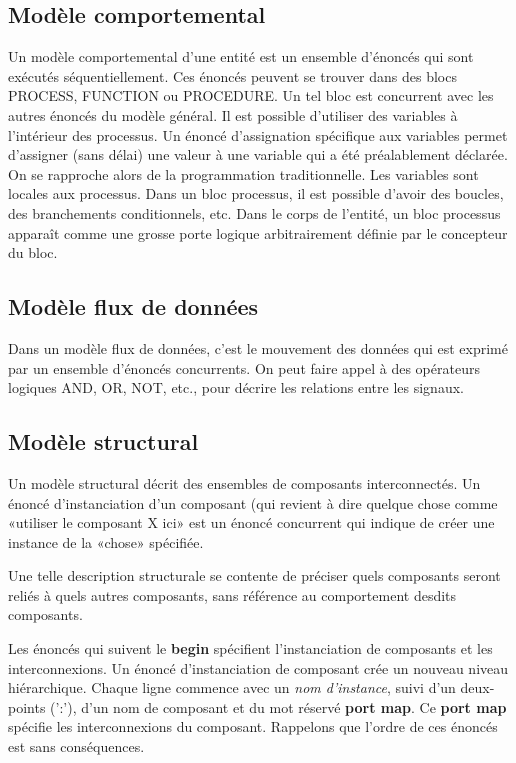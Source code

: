 \documentclass[11pt]{article}
\begin{document}
\subsection{Modèle comportemental}
\label{sec:orged5b6d6}

Un modèle comportemental d'une entité est un ensemble d'énoncés qui
sont exécutés séquentiellement. Ces énoncés peuvent se trouver dans
des blocs PROCESS, FUNCTION ou PROCEDURE. Un tel bloc est concurrent
avec les autres énoncés du modèle général. Il est possible d'utiliser
des variables à l'intérieur des processus. Un énoncé d'assignation
spécifique aux variables permet d'assigner (sans délai) une valeur à
une variable qui a été préalablement déclarée. On se rapproche alors
de la programmation traditionnelle. Les variables sont locales aux
processus. Dans un bloc processus, il est possible d'avoir des
boucles, des branchements conditionnels, etc. Dans le corps de
l'entité, un bloc processus apparaît comme une grosse porte logique
arbitrairement définie par le concepteur du bloc.

\subsection{Modèle flux de données}
\label{sec:orgf9a83f7}

Dans un modèle flux de données, c'est le mouvement des données qui est
exprimé par un ensemble d'énoncés concurrents. On peut faire appel à
des opérateurs logiques AND, OR, NOT, etc., pour décrire les relations
entre les signaux.

\subsection{Modèle structural}
\label{sec:org89e32dd}

Un modèle structural décrit des ensembles de composants
interconnectés. Un énoncé d'instanciation d'un composant (qui revient
à dire quelque chose comme «utiliser le composant X ici» est un énoncé
concurrent qui indique de créer une instance de la «chose» spécifiée.

Une telle description structurale se contente de préciser quels
composants seront reliés à quels autres composants, sans référence au
comportement desdits composants.

Les énoncés qui suivent le \textbf{begin} spécifient l'instanciation de
composants et les interconnexions. Un énoncé d'instanciation de
composant crée un nouveau niveau hiérarchique. Chaque ligne commence
avec un \emph{nom d'instance}, suivi d'un deux-points (':'), d'un nom de
composant et du mot réservé \textbf{port map}.  Ce \textbf{port map} spécifie les
interconnexions du composant. Rappelons que l'ordre de ces
énoncés est sans conséquences.
\end{document}
